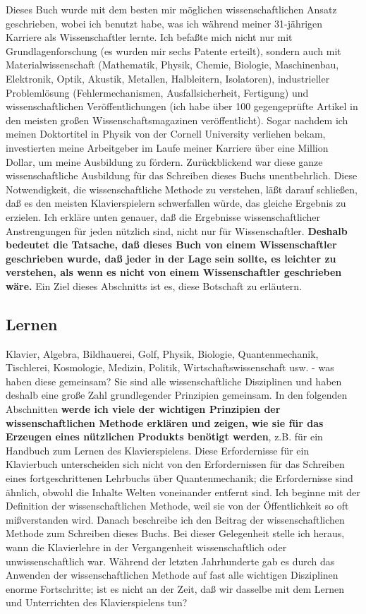 Dieses Buch wurde mit dem besten mir möglichen wissenschaftlichen Ansatz geschrieben, wobei ich benutzt habe, was ich während meiner 31-jährigen Karriere als Wissenschaftler lernte.
 Ich befaßte mich nicht nur mit Grundlagenforschung (es wurden mir sechs Patente erteilt), sondern auch mit Materialwissenschaft (Mathematik, Physik, Chemie, Biologie, Maschinenbau, Elektronik, Optik, Akustik, Metallen, Halbleitern, Isolatoren), industrieller Problemlösung (Fehlermechanismen, Ausfallsicherheit, Fertigung) und wissenschaftlichen Veröffentlichungen (ich habe über 100 gegengeprüfte Artikel in den meisten großen Wissenschaftsmagazinen veröffentlicht).
 Sogar nachdem ich meinen Doktortitel in Physik von der Cornell University verliehen bekam, investierten meine Arbeitgeber im Laufe meiner Karriere über eine Million Dollar, um meine Ausbildung zu fördern.
 Zurückblickend war diese ganze wissenschaftliche Ausbildung für das Schreiben dieses Buchs unentbehrlich.
 Diese Notwendigkeit, die wissenschaftliche Methode zu verstehen, läßt darauf schließen, daß es den meisten Klavierspielern schwerfallen würde, das gleiche Ergebnis zu erzielen.
 Ich erkläre unten genauer, daß die Ergebnisse wissenschaftlicher Anstrengungen für jeden nützlich sind, nicht nur für Wissenschaftler.
 \textbf{Deshalb bedeutet die Tatsache, daß dieses Buch von einem Wissenschaftler geschrieben wurde, daß jeder in der Lage sein sollte, es leichter zu verstehen, als wenn es nicht von einem Wissenschaftler geschrieben wäre.}
 Ein Ziel dieses Abschnitts ist es, diese Botschaft zu erläutern.
 \hypertarget{c3_2b}{}

\subsection{Lernen}

Klavier, Algebra, Bildhauerei, Golf, Physik, Biologie, Quantenmechanik, Tischlerei, Kosmologie, Medizin, Politik, Wirtschaftswissenschaft usw. - was haben diese gemeinsam?
 Sie sind alle wissenschaftliche Disziplinen und haben deshalb eine große Zahl grundlegender Prinzipien gemeinsam.
 In den folgenden Abschnitten \textbf{ werde ich viele der wichtigen Prinzipien der wissenschaftlichen Methode erklären und zeigen, wie sie für das Erzeugen eines nützlichen Produkts benötigt werden}, z.B. für ein Handbuch zum Lernen des Klavierspielens.
 Diese Erfordernisse für ein Klavierbuch unterscheiden sich nicht von den Erfordernissen für das Schreiben eines fortgeschrittenen Lehrbuchs über Quantenmechanik; die Erfordernisse sind ähnlich, obwohl die Inhalte Welten voneinander entfernt sind.
 Ich beginne mit der Definition der wissenschaftlichen Methode, weil sie von der Öffentlichkeit so oft mißverstanden wird.
 Danach beschreibe ich den Beitrag der wissenschaftlichen Methode zum Schreiben dieses Buchs.
 Bei dieser Gelegenheit stelle ich heraus, wann die Klavierlehre in der Vergangenheit wissenschaftlich oder unwissenschaftlich war.
 Während der letzten Jahrhunderte gab es durch das Anwenden der wissenschaftlichen Methode auf fast alle wichtigen Disziplinen enorme Fortschritte; ist es nicht an der Zeit, daß wir dasselbe mit dem Lernen und Unterrichten des Klavierspielens tun?
 

